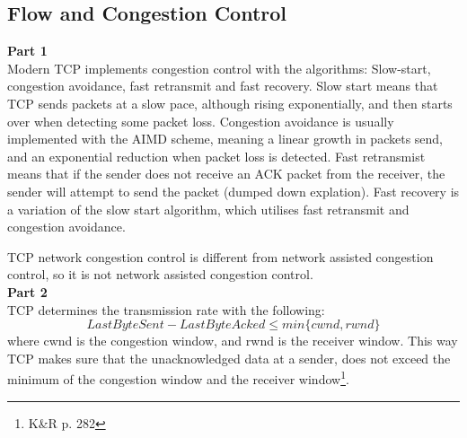 \subsection{Flow and Congestion Control}
\textbf{Part 1}\\
Modern TCP implements congestion control with the algorithms:
Slow-start, congestion avoidance, fast retransmit and fast
recovery. Slow start means that TCP sends packets at a slow pace,
although rising exponentially, and then starts over when detecting
some packet loss. Congestion avoidance is usually implemented with the
AIMD scheme, meaning a linear growth in packets send, and an
exponential reduction when packet loss is detected. Fast retransmist
means that if the sender does not receive an ACK packet from the
receiver, the sender will attempt to send the packet (dumped down
explation). Fast recovery is a variation of the slow start algorithm,
which utilises fast retransmit and congestion avoidance.

TCP network congestion control is different from network assisted congestion
control, so it is not network assisted congestion control.\\

\noindent \textbf{Part 2}\\
TCP determines the transmission rate with the following:
\[
LastByteSent - LastByteAcked \leq min\{cwnd, rwnd\}
\]
where cwnd is the congestion window, and rwnd is the receiver
window. This way TCP makes sure that the unacknowledged data at a
sender, does not exceed the minimum of the congestion window and the
receiver window\footnote{K\&R p. 282}.